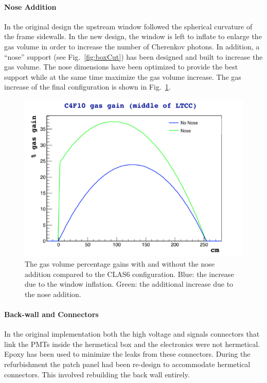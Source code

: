 \paragraph{Nose Addition}

In the original design the upstream window followed the spherical curvature of the frame sidewalls. In the new design, the window is left to inflate
to enlarge the gas volume in order to increase the number of Cherenkov photons. In addition, a ``nose'' support (see Fig.~\ref{fig:boxCut})
has been designed and built to increase the gas volume.
The nose dimensions have been optimized to provide the best support while at the same time maximize the gas volume increase. The gas increase
of the final configuration is shown in Fig.~\ref{fig:noseVolume}.

\begin{figure}[hbt]
	\centering
	\includegraphics[width=1.0\columnwidth,keepaspectratio]{img/noseVolume.png}
	\caption{The gas volume percentage gains with and without the nose addition compared to the CLAS6 configuration. Blue: the increase due
	          to the window inflation. Green: the additional increase due to the nose addition. }
	\label{fig:noseVolume}
\end{figure}


\paragraph{Back-wall and Connectors}
In the original implementation both the high voltage and signals connectors that link the PMTs inside the hermetical box and the electronics were not
hermetical. Epoxy has been used to minimize the leaks from these connectors.
During the refurbishment the patch panel had been re-design to accommodate hermetical connectors. This involved rebuilding the back wall entirely.

